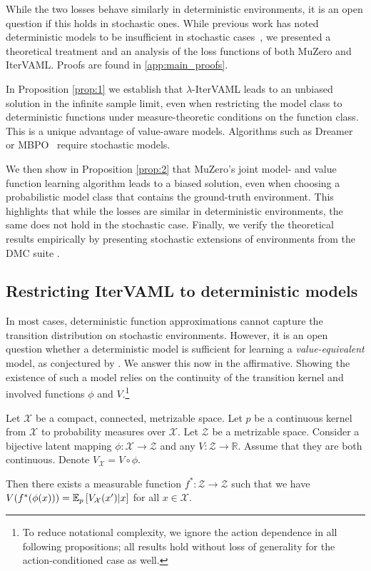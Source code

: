 While the two losses behave similarly in deterministic environments, it is an open question if this holds in stochastic ones.
While previous work has noted deterministic models to be insufficient in stochastic cases~\parencite{antonoglou2022planning}, we presented a theoretical treatment and an analysis of the loss functions of both MuZero and IterVAML.
Proofs are found in \autoref{app:main_proofs}.

In Proposition \ref{prop:1} we establish that $\lambda$-IterVAML leads to an unbiased solution in the infinite sample limit, even when restricting the model class to deterministic functions under measure-theoretic conditions on the function class.
This is a unique advantage of value-aware models.
Algorithms such as Dreamer~\parencite{Hafner2020Dream} or MBPO~\parencite{mbpo} require stochastic models.


We then show in Proposition \ref{prop:2} that MuZero's joint model- and value function learning algorithm leads to a biased solution, even when choosing a probabilistic model class that contains the ground-truth environment.
This highlights that while the losses are similar in deterministic environments, the same does not hold in the stochastic case.
Finally, we verify the theoretical results empirically by presenting stochastic extensions of environments from the DMC suite \parencite{tunyasuvunakool2020}.

\subsection{Restricting IterVAML to deterministic models}


In most cases, deterministic function approximations cannot capture the transition distribution on stochastic environments.
However, it is an open question whether a deterministic model is sufficient for learning a \emph{value-equivalent} model, as conjectured by \parencite{oh2017value}.
We answer this now in the affirmative.
Showing the existence of such a model relies on the continuity of the transition kernel and involved functions $\phi$ and $V$.\footnote{To reduce notational complexity, we ignore the action dependence in all following propositions; all results hold without loss of generality for the action-conditioned case as well.}

\begin{proposition}
\label{prop:1}
    Let $\mathcal{X}$ be a compact, connected, metrizable space. Let $p$ be a continuous kernel from $\mathcal{X}$ to probability measures over $\mathcal{X}$. Let $\mathcal{Z}$ be a metrizable space. Consider a bijective latent mapping $\phi: \mathcal{X} \rightarrow \mathcal{Z}$ and any $V: \mathcal{Z} \rightarrow \mathbb{R}$. Assume that they are both continuous. Denote $V_\mathcal{X} = V \circ \phi$.
    
    Then there exists a measurable function $f^*: \mathcal{Z} \rightarrow \mathcal{Z}$ such that we have $V(f^*(\phi(x))) = \mathbb{E}_{p}\left[  V_\mathcal{X}(x')|x \right]$ for all $x \in \mathcal{X}$.
\end{proposition}

